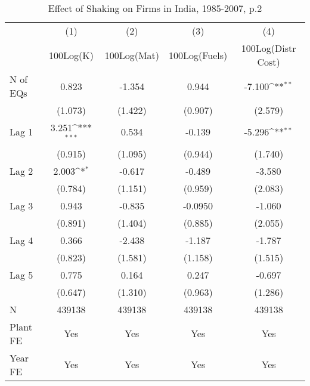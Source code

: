\begin{table}[htbp]\centering
\def\sym#1{\ifmmode^{#1}\else\(^{#1}\)\fi}
\caption{Effect of Shaking on Firms in India, 1985-2007, p.2}
\begin{tabular}{l*{4}{c}}
\toprule
                &\multicolumn{1}{c}{(1)}&\multicolumn{1}{c}{(2)}&\multicolumn{1}{c}{(3)}&\multicolumn{1}{c}{(4)}\\
                &\multicolumn{1}{c}{100Log(K)}&\multicolumn{1}{c}{100Log(Mat)}&\multicolumn{1}{c}{100Log(Fuels)}&\multicolumn{1}{c}{100Log(Distr Cost)}\\
\midrule
N of EQs        &    0.823         &   -1.354         &    0.944         &   -7.100\sym{**} \\
                &  (1.073)         &  (1.422)         &  (0.907)         &  (2.579)         \\
\addlinespace
Lag 1           &    3.251\sym{***}&    0.534         &   -0.139         &   -5.296\sym{**} \\
                &  (0.915)         &  (1.095)         &  (0.944)         &  (1.740)         \\
\addlinespace
Lag 2           &    2.003\sym{*}  &   -0.617         &   -0.489         &   -3.580         \\
                &  (0.784)         &  (1.151)         &  (0.959)         &  (2.083)         \\
\addlinespace
Lag 3           &    0.943         &   -0.835         &  -0.0950         &   -1.060         \\
                &  (0.891)         &  (1.404)         &  (0.885)         &  (2.055)         \\
\addlinespace
Lag 4           &    0.366         &   -2.438         &   -1.187         &   -1.787         \\
                &  (0.823)         &  (1.581)         &  (1.158)         &  (1.515)         \\
\addlinespace
Lag 5           &    0.775         &    0.164         &    0.247         &   -0.697         \\
                &  (0.647)         &  (1.310)         &  (0.963)         &  (1.286)         \\
\midrule
N               &   439138         &   439138         &   439138         &   439138         \\
Plant FE        &      Yes         &      Yes         &      Yes         &      Yes         \\
Year FE         &      Yes         &      Yes         &      Yes         &      Yes         \\

\end{tabular}
\end{table}
